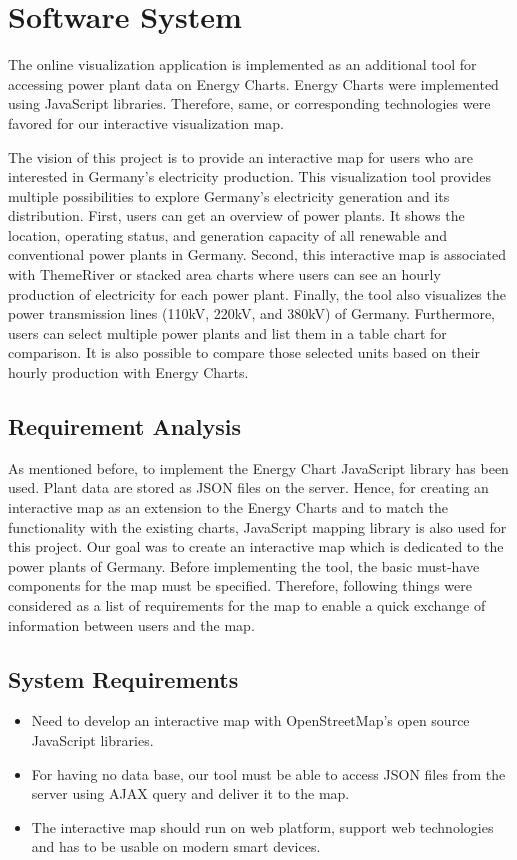 \chapter{Software System}
\label{chap:softwareSystem}

The online visualization application is implemented as an additional tool for accessing power plant data on Energy Charts. Energy Charts were implemented using JavaScript libraries. Therefore, same, or corresponding technologies were favored for our interactive visualization map. 

The vision of this project is to provide an interactive map for users who are interested in Germany’s electricity production.  This visualization tool provides multiple possibilities to explore Germany’s electricity generation and its distribution. First, users can get an overview of power plants. It shows the location, operating status, and generation capacity of all renewable and conventional power plants in Germany. Second, this interactive map is associated with ThemeRiver or stacked area charts where users can see an hourly production of electricity for each power plant. Finally, the tool also visualizes the power transmission lines (110kV, 220kV, and 380kV) of Germany. Furthermore, users can select multiple power plants and list them in a table chart for comparison. It is also possible to compare those selected units based on their hourly production with Energy Charts. 

\section{Requirement Analysis}
\label{sec:reqAn}

As mentioned before, to implement the Energy Chart JavaScript library has been used. Plant data are stored as JSON files on the server. Hence, for creating an interactive map as an extension to the Energy Charts and to match the functionality with the existing charts, JavaScript mapping library is also used for this project. Our goal was to create an interactive map which is dedicated to the power plants of Germany. Before implementing the tool, the basic must-have components for the map must be specified. Therefore, following things were considered as a list of requirements for the map to enable a quick exchange of information between users and the map.

\section*{System Requirements}
\begin{itemize}
	\item{Need to develop an interactive map with OpenStreetMap's open source JavaScript libraries.}
	\item{For having no data base, our tool must be able to access JSON files from the server using AJAX query and deliver it to the map.}
	\item{The interactive map should run on web platform, support web technologies and has to be usable on modern smart devices.}
\end{itemize}

